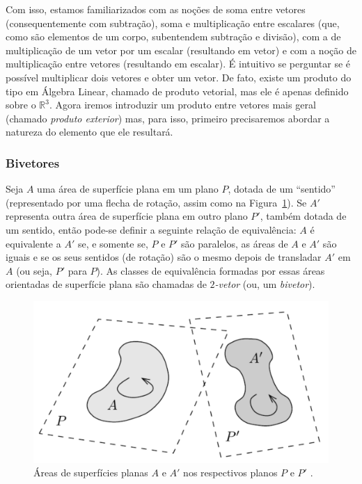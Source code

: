 \documentclass[a4paper,12pt]{report}
\theoremstyle{plain}
\theoremstyle{definition}
\begin{document}
	Com isso, estamos familiarizados com as noções de soma entre vetores (consequentemente com subtração), soma e multiplicação entre escalares (que, como são elementos de um corpo, subentendem subtração e divisão), com a de multiplicação de um vetor por um escalar (resultando em vetor) e com a noção de multiplicação entre vetores (resultando em escalar). É intuitivo se perguntar se é possível multiplicar dois vetores e obter um vetor. De fato, existe um produto do tipo em Álgebra Linear, chamado de produto vetorial, mas ele é apenas definido sobre o $\mathbb{R}^3$. Agora iremos introduzir um produto entre vetores mais geral (chamado \textit{produto exterior}) mas, para isso, primeiro precisaremos abordar a natureza do elemento que ele resultará.
	
	\subsubsection{Bivetores}
	
	Seja $A$ uma área de superfície plana em um plano $P$, dotada de um ``sentido'' (representado por uma flecha de rotação, assim como na Figura~\ref{fig:2blade}). Se $A'$ representa outra área de superfície plana em outro plano $P'$, também dotada de um sentido, então pode-se definir a seguinte relação de equivalência: $A$ é equivalente a $A'$ se, e somente se, $P$ e $P'$ são paralelos, as áreas de $A$ e $A'$ são iguais e se os seus sentidos (de rotação) são o mesmo depois de transladar $A'$ em $A$ (ou seja, $P'$ para $P$). As classes de equivalência formadas por essas áreas orientadas de superfície plana são chamadas de \textit{$2$-vetor} (ou, um \textit{bivetor}).

	\begin{figure}[H]
		\begin{center}
			\includegraphics[width=0.5\linewidth]{figures/2blade.pdf}
		\end{center}
		\caption{Áreas de superfícies planas $A$ e $A'$ nos respectivos planos $P$ e $P'$ \cite{lundholm2009clifford}.}
		\label{fig:2blade}
	\end{figure}
	
\end{document}
